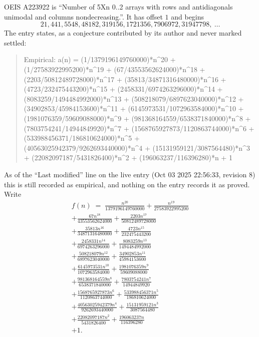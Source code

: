 \documentclass[11pt,a4paper]{article}
\theoremstyle{plain}
\theoremstyle{definition}
\begin{document}
OEIS A223922 is ``Number of 5Xn 0..2 arrays with rows and antidiagonals unimodal and columns nondecreasing.''. It has offset $1$ and begins
\[
21, 441, 5548, 48182, 319156, 1721356, 7906972, 31947798,\ \dots
\]
The entry states, as a conjecture contributed by its author and never marked settled:
\begin{quote}\raggedright\small
Empirical: a(n) = (1/1379196149760000)*n\^{}20 + (1/27583922995200)*n\^{}19 + (67/43553562624000)*n\^{}18 + (2203/50812489728000)*n\^{}17 + (35813/34871316480000)*n\^{}16 + (4723/232475443200)*n\^{}15 + (2458331/6974263296000)*n\^{}14 + (8083259/1494484992000)*n\^{}13 + (508218079/6897623040000)*n\^{}12 + (34902853/45984153600)*n\^{}11 + (6145973531/1072963584000)*n\^{}10 + (1981076359/59609088000)*n\^{}9 + (981368164559/6538371840000)*n\^{}8 + (7803754241/14944849920)*n\^{}7 + (1568765927873/1120863744000)*n\^{}6 + (533988456371/186810624000)*n\^{}5 + (40563025942379/9262693440000)*n\^{}4 + (15131959121/3087564480)*n\^{}3 + (22082097187/5431826400)*n\^{}2 + (196063237/116396280)*n + 1
\end{quote}
As of the ``Last modified'' line on the live entry (Oct 03 2025 22:56:33, revision 8) this is still
recorded as empirical, and nothing on the entry records it as proved. Write
\begin{multline*}
f(n)\;=\;\frac{n^{20}}{1379196149760000} + \frac{n^{19}}{27583922995200} \\
+ \frac{67 n^{18}}{43553562624000} + \frac{2203 n^{17}}{50812489728000} \\
+ \frac{35813 n^{16}}{34871316480000} + \frac{4723 n^{15}}{232475443200} \\
+ \frac{2458331 n^{14}}{6974263296000} + \frac{8083259 n^{13}}{1494484992000} \\
+ \frac{508218079 n^{12}}{6897623040000} + \frac{34902853 n^{11}}{45984153600} \\
+ \frac{6145973531 n^{10}}{1072963584000} + \frac{1981076359 n^{9}}{59609088000} \\
+ \frac{981368164559 n^{8}}{6538371840000} + \frac{7803754241 n^{7}}{14944849920} \\
+ \frac{1568765927873 n^{6}}{1120863744000} + \frac{533988456371 n^{5}}{186810624000} \\
+ \frac{40563025942379 n^{4}}{9262693440000} + \frac{15131959121 n^{3}}{3087564480} \\
+ \frac{22082097187 n^{2}}{5431826400} + \frac{196063237 n}{116396280} \\
+ 1.
\end{multline*}
\end{document}
